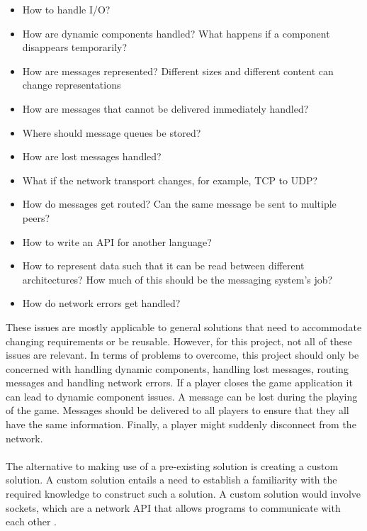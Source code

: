 \begin{itemize}
    \item How to handle I/O?
    \item How are dynamic components handled? What happens if a component disappears temporarily?
    \item How are messages represented? Different sizes and different content can change representations
    \item How are messages that cannot be delivered immediately handled?
    \item Where should message queues be stored?
    \item How are lost messages handled?
    \item What if the network transport changes, for example, TCP to UDP?
    \item How do messages get routed? Can the same message be sent to multiple peers?
    \item How to write an API for another language?
    \item How to represent data such that it can be read between different architectures? How much of this should be the messaging system's job?
    \item How do network errors get handled?
\end{itemize}
These issues are mostly applicable to general solutions that need to accommodate changing requirements or be reusable.
However, for this project, not all of these issues are relevant.
In terms of problems to overcome, this project should only be concerned with handling dynamic components, handling lost messages, routing messages and handling network errors.
If a player closes the game application it can lead to dynamic component issues.
A message can be lost during the playing of the game. 
Messages should be delivered to all players to ensure that they all have the same information.
Finally, a player might suddenly disconnect from the network. 
\\\\
The alternative to making use of a pre-existing solution is creating a custom solution.
A custom solution entails a need to establish a familiarity with the required knowledge to construct such a solution.
A custom solution would involve sockets, which are a network API  that allows programs to communicate with each other \cite{socketnetworking}.

